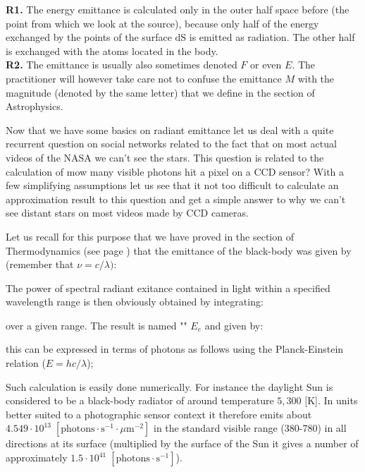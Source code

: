 	\begin{tcolorbox}[title=Remarks,colframe=black,arc=10pt]
	\textbf{R1.} The energy emittance is calculated only in the outer half space before (the point from which we look at the source), because only half of the energy exchanged by the points of the surface $\mathrm{d}$S is emitted as radiation. The other half is exchanged with the atoms located in the body.\\
	
	\textbf{R2.} The emittance is usually also sometimes denoted $F$ or even $E$. The practitioner will however take care not to confuse the emittance $M$ with the magnitude (denoted by the same letter) that we define in the section of Astrophysics.
	\end{tcolorbox}
	
	Now that we have some basics on radiant emittance let us deal with a quite recurrent question on social networks related to the fact that on most actual videos of the NASA we can't see the stars. This question is related to the calculation of mow many visible photons hit a pixel on a CCD sensor? With a few simplifying assumptions let us see that it not too difficult to calculate an approximation result to this question and get a simple answer to why we can't see distant stars on most videos made by CCD cameras.

	Let us recall for this purpose that we have proved in the section of Thermodynamics (see page \pageref{planck law}) that the emittance of the black-body was given by (remember that $\nu=c/\lambda)$:
	
	The power of spectral radiant exitance contained in light within a specified wavelength range is then obviously obtained by integrating:
	
	over a given range. The result is named "" $E_e$ and given by:
	
	this can be expressed in terms of photons as follows using the Planck-Einstein relation ($E=hc/\lambda$);
	
	Such calculation is easily done numerically.  For instance the daylight Sun is considered to be a black-body radiator of around temperature $5,300$ [K].  In units better suited to a photographic sensor context it therefore emits about $4.549\cdot 10^{13}\; [\text{photons}\cdot\text{s}^{-1}\cdot\mu\text{m}^{-2}]$ in the standard visible range (380-780) in all directions at its surface (multiplied by the surface of the Sun it gives a number of approximately $1.5\cdot 10^{41}\;[\text{photons}\cdot\text{s}^{-1}]$). 
	
